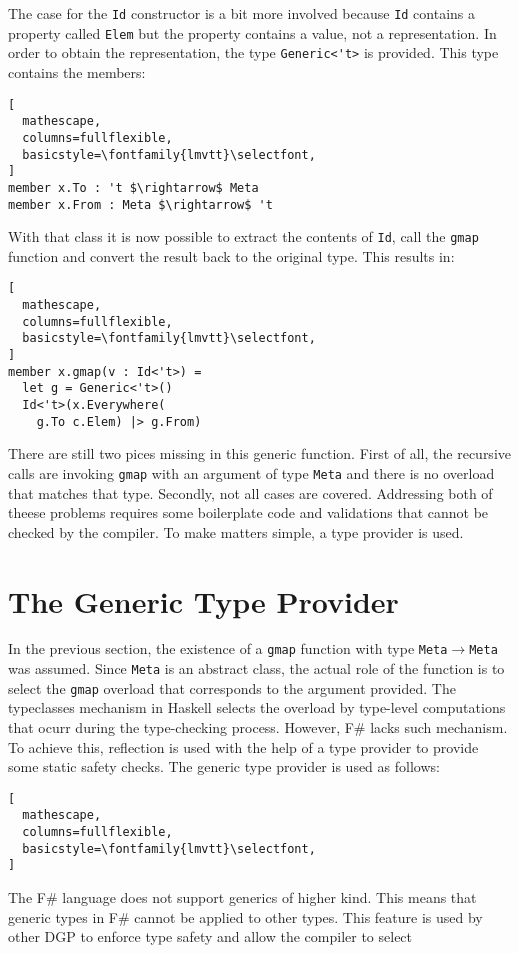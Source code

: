 \documentclass{sigplanconf}
\begin{document}
The case for the \verb+Id+ constructor is a bit more involved because \verb+Id+ contains a property called \verb+Elem+ but the property contains a value, not a representation. In order to obtain the representation, the type \verb+Generic<'t>+ is provided. This type contains the members:
\begin{lstlisting}[
  mathescape,
  columns=fullflexible,
  basicstyle=\fontfamily{lmvtt}\selectfont,
]
member x.To : 't $\rightarrow$ Meta
member x.From : Meta $\rightarrow$ 't
\end{lstlisting}
With that class it is now possible to extract the contents of \verb+Id+, call the \verb+gmap+ function and convert the result back to the original type. This results in:
\begin{lstlisting}[
  mathescape,
  columns=fullflexible,
  basicstyle=\fontfamily{lmvtt}\selectfont,
]
member x.gmap(v : Id<'t>) =
  let g = Generic<'t>()
  Id<'t>(x.Everywhere(
    g.To c.Elem) |> g.From)
\end{lstlisting}
There are still two pices missing in this generic function. First of all, the recursive calls are invoking \verb+gmap+ with an argument of type \verb+Meta+ and there is no overload that matches that type. Secondly, not all cases are covered. Addressing both of theese problems requires some boilerplate code and validations that cannot be checked by the compiler. To make matters simple, a type provider is used.
\section{The Generic Type Provider}
In the previous section, the existence of a \verb+gmap+ function with type \verb+Meta+$\to$\verb+Meta+ was assumed. Since \verb+Meta+ is an abstract class, the actual role of the function is to select the \verb+gmap+ overload that corresponds to the argument provided. The typeclasses mechanism in Haskell selects the overload by type-level computations that ocurr during the type-checking process. However, F\# lacks such mechanism. To achieve this, reflection is used with the help of a type provider to provide some static safety checks. The generic type provider is used as follows:
\begin{lstlisting}[
  mathescape,
  columns=fullflexible,
  basicstyle=\fontfamily{lmvtt}\selectfont,
]
\end{lstlisting}

The F\# language does not support generics of higher kind. This means that generic types in F\# cannot be applied to other types. This feature is used by other DGP \cite{Regular,MultiRec,GenericDeriving,RepLib} to enforce type safety and allow the compiler to select  
\end{document}
